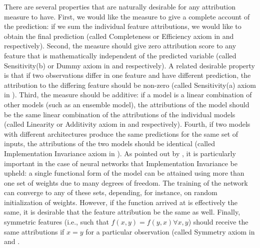 {			There are several properties that are naturally desirable for any attribution measure to have. First, we would like the measure to give a complete account of the prediction: if we sum the individual feature attributions, we would like to obtain the final prediction (called Completeness or Efficiency axiom in \cite{sundararajan2017axiomatic} and \cite{molnar2020interpretable} respectively). Second, the measure should give zero attribution score to any feature that is mathematically independent of the predicted variable (called Sensitivity(b) or Dummy axiom in \cite{sundararajan2017axiomatic} and \cite{molnar2020interpretable} respectively). A related desirable property is that if two observations differ in one feature and have different prediction, the attribution to the differing feature should be non-zero (called Sensitivity(a) axiom in \cite{sundararajan2017axiomatic}). Third, the measure should be additive: if a model is a linear combination of other models (such as an ensemble model), the attributions of the model should be the same linear combination of the attributions of the individual models (called Linearity or Additivity axiom in \cite{sundararajan2017axiomatic} and \cite{molnar2020interpretable} respectively). Fourth, if two models with different architectures produce the same predictions for the same set of inputs, the attributions of the two models should be identical (called Implementation Invariance axiom in \cite{sundararajan2017axiomatic}). As pointed out by \cite{sundararajan2017axiomatic}, it is particularly important in the case of neural networks that Implementation Invariance be upheld: a single functional form of the model can be attained using more than one set of weights due to many degrees of freedom. The training of the network can converge to any of these sets, depending, for instance, on random initialization of weights. However, if the function arrived at is effectively the same, it is desirable that the feature attribution be the same as well. Finally, symmetric features (i.e., such that $f(x,y) = f(y,x) \forall x, y$) should receive the same attributions if $x=y$ for a particular observation (called Symmetry axiom in \cite{shrikumar2017learning} and  \cite{molnar2020interpretable}. 
			
}
